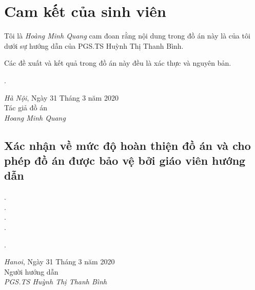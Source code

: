 \pagebreak

\section*{Cam kết của sinh viên}
Tôi là \textit{Hoàng Minh Quang} cam đoan rằng nội dung trong đồ án này là của tôi dưới sự hướng dẫn của PGS.TS Huỳnh Thị Thanh Bình.

Các đề xuất và kết quả trong đồ án này đều là xác thực và nguyên bản.
\begin{minipage}{0.5\textwidth}
.
\end{minipage}
\begin{minipage}[t]{0.5\textwidth}



\begin{center}
  \textit{Hà Nội}, Ngày 31 Tháng 3 năm 2020\\
  Tác giả đồ án\\[3cm]
  
  \textit{Hoang Minh Quang}
\end{center}
\end{minipage}
\subsection*{Xác nhận về mức độ hoàn thiện đồ án và cho phép đồ án được bảo vệ bởi giáo viên hướng dẫn}
.\dotfill \\
.\dotfill \\ 
.\dotfill \\ 
.\dotfill \\
\begin{minipage}{0.5\textwidth}
.
\end{minipage}
\begin{minipage}[t]{0.5\textwidth}

\begin{center}
  \textit{Hanoi}, Ngày 31 Tháng 3 năm 2020\\
  Người hướng dẫn\\[3cm]
  
  \textit{PGS.TS Huỳnh Thị Thanh Bình}
\end{center}
\end{minipage}

\pagebreak
